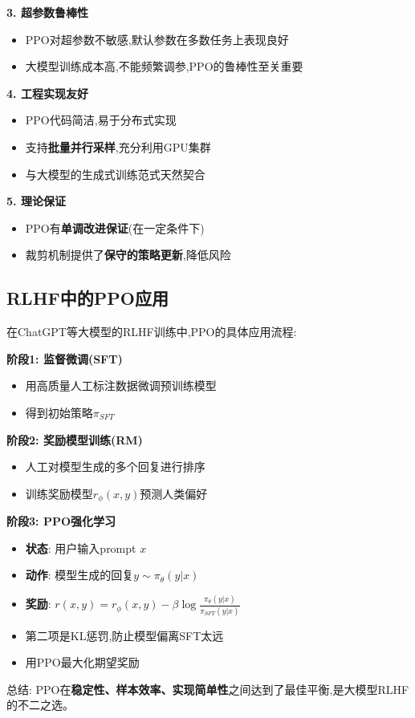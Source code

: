 \documentclass[UTF8]{ctexart}
\begin{document}
\textbf{3. 超参数鲁棒性}
\begin{itemize}
    \item PPO对超参数不敏感,默认参数在多数任务上表现良好
    \item 大模型训练成本高,不能频繁调参,PPO的鲁棒性至关重要
\end{itemize}

\textbf{4. 工程实现友好}
\begin{itemize}
    \item PPO代码简洁,易于分布式实现
    \item 支持\textbf{批量并行采样},充分利用GPU集群
    \item 与大模型的生成式训练范式天然契合
\end{itemize}

\textbf{5. 理论保证}
\begin{itemize}
    \item PPO有\textbf{单调改进保证}(在一定条件下)
    \item 裁剪机制提供了\textbf{保守的策略更新},降低风险
\end{itemize}

\subsection{RLHF中的PPO应用}

在ChatGPT等大模型的RLHF训练中,PPO的具体应用流程:

\textbf{阶段1: 监督微调(SFT)}
\begin{itemize}
    \item 用高质量人工标注数据微调预训练模型
    \item 得到初始策略$\pi_{SFT}$
\end{itemize}

\textbf{阶段2: 奖励模型训练(RM)}
\begin{itemize}
    \item 人工对模型生成的多个回复进行排序
    \item 训练奖励模型$r_\phi(x,y)$预测人类偏好
\end{itemize}

\textbf{阶段3: PPO强化学习}
\begin{itemize}
    \item \textbf{状态}: 用户输入prompt $x$
    \item \textbf{动作}: 模型生成的回复$y \sim \pi_\theta(y|x)$
    \item \textbf{奖励}: $r(x,y) = r_\phi(x,y) - \beta \log\frac{\pi_\theta(y|x)}{\pi_{SFT}(y|x)}$
    \item 第二项是KL惩罚,防止模型偏离SFT太远
    \item 用PPO最大化期望奖励
\end{itemize}
总结: PPO在\textbf{稳定性、样本效率、实现简单性}之间达到了最佳平衡,是大模型RLHF的不二之选。
\end{document}
